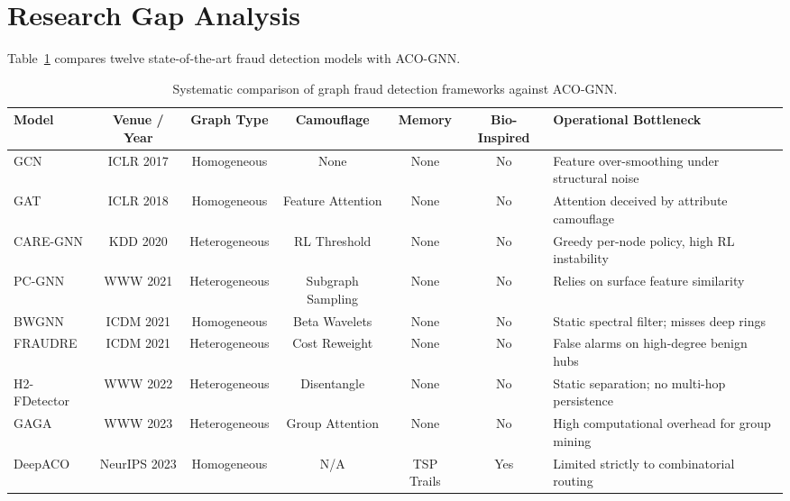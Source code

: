\section[Research Gap Analysis]{\textbf{Research Gap Analysis}}
\label{sec:research_gap}

Table~\ref{tab:lit_comparison} compares twelve state-of-the-art fraud detection models with ACO-GNN.

\begin{table}[htb]
\centering
\caption[Comparison of graph fraud detection frameworks against ACO-GNN]{Systematic comparison of graph fraud detection frameworks against ACO-GNN.}
\label{tab:lit_comparison}
\scriptsize
\setlength{\tabcolsep}{2.2pt}
\begin{tabularx}{\textwidth}{@{}l c c c c c >{\raggedright\arraybackslash}X@{}}
\toprule
\textbf{Model} & \textbf{Venue / Year} & \textbf{Graph Type} & \textbf{Camouflage} & \textbf{Memory} & \textbf{Bio-Inspired} & \textbf{Operational Bottleneck} \\
\midrule
GCN \cite{kipf2017semi} & ICLR 2017 & Homogeneous & None & None & No & Feature over-smoothing under structural noise \\
GAT \cite{velivckovic2018graph} & ICLR 2018 & Homogeneous & Feature Attention & None & No & Attention deceived by attribute camouflage \\
CARE-GNN \cite{dou2020enhancing} & KDD 2020 & Heterogeneous & RL Threshold & None & No & Greedy per-node policy, high RL instability \\
PC-GNN \cite{liu2021pick} & WWW 2021 & Heterogeneous & Subgraph Sampling & None & No & Relies on surface feature similarity \\
BWGNN \cite{tang2021rethinking} & ICDM 2021 & Homogeneous & Beta Wavelets & None & No & Static spectral filter; misses deep rings \\
FRAUDRE \cite{zhang2021fraudre} & ICDM 2021 & Heterogeneous & Cost Reweight & None & No & False alarms on high-degree benign hubs \\
H2-FDetector \cite{shi2022h2} & WWW 2022 & Heterogeneous & Disentangle & None & No & Static separation; no multi-hop persistence \\
GAGA \cite{wang2023gaga} & WWW 2023 & Heterogeneous & Group Attention & None & No & High computational overhead for group mining \\
DeepACO \cite{ye2023deepaco} & NeurIPS 2023 & Homogeneous & N/A & TSP Trails & Yes & Limited strictly to combinatorial routing \\

\end{tabularx}
\end{table}
